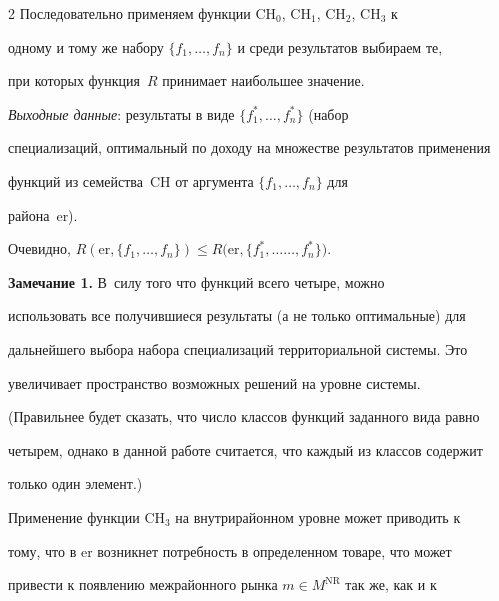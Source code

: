 \begin{multicols}{2}
  Последовательно применяем функции CH$_0$, CH$_1$, CH$_2$, CH$_3$ к 


одному и тому же набору $\{f_1, \ldots ,f_n\}$ и среди результатов выбираем те, 


при которых функция~$R$ принимает наибольшее значение. 





\textit{Выходные данные}: результаты в виде $\{f_1^*, \ldots , f_n^*\}$ (набор 


специализаций, оптимальный по доходу на множестве результатов применения 


функций из семейства~CH от аргумента $\{f_1, \ldots , f_n\}$ для 


района~er).





Очевидно, $R(\mathrm{er},\{f_1, \ldots , f_n\})\leq R(\mathrm{er},\{f_1^*, \ldots$\linebreak $\ldots , f_n^*\})$.





\medskip





\noindent


\textbf{Замечание 1.} В~силу того что функций всего четыре, можно 


использовать все получившиеся результаты (а не только оптимальные) для 


дальнейшего выбора набора специализаций территориальной системы. Это 


увеличивает пространство возможных решений на уровне системы. 


  


  (Правильнее будет сказать, что число классов функций заданного вида равно 


четырем, однако в данной работе считается, что каждый из классов содержит 


только один элемент.)


  \medskip


  


  Применение функции CH$_3$ на внутрирайонном уровне может приводить к 


тому, что в er возникнет потребность в определенном товаре, что может 


привести к появлению межрайонного рынка $m\in M^{\mathrm{NR}}$ так же, как и к 



\end{multicols}
